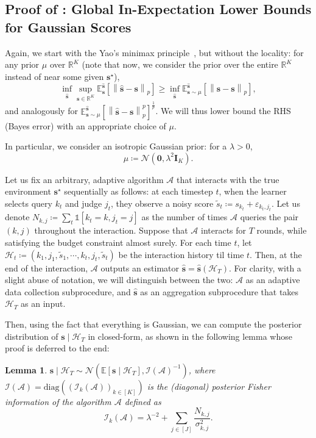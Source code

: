 \documentclass{article}
\def\vzero{{\bm{0}}}
\def\vs{{\bm{s}}}
\def\mI{{\bm{I}}}
\def\gA{{\mathcal{A}}}
\def\gH{{\mathcal{H}}}
\def\gI{{\mathcal{I}}}
\def\gN{{\mathcal{N}}}
\def\sR{{\mathbb{R}}}
\newcommand{\E}{\mathbb{E}}
\theoremstyle{plain}
\newtheorem{lemma}[theorem]{Lemma}
\theoremstyle{definition}
\theoremstyle{plain}
\newcommand{\bignorm}[1]{\left\lVert #1 \right\rVert}
\newcommand{\indicator}{\mathds{1}}
\begin{document}
\subsection{\texorpdfstring{Proof of : Global In-Expectation Lower Bounds for Gaussian Scores}{Proof of Theorem F.6: Global In-Expectation Lower Bounds for Gaussian Scores}}
\label{app:lower-bound-exp-gaussian}

Again, we start with the Yao's minimax principle~\citep{yao1977}, but without the locality: for any prior $\mu$ over $\sR^K$ (note that now, we consider the prior over the entire $\sR^K$ instead of near some given $\vs^\star$),
\begin{equation}
    \inf_{\hat{\vs}} \sup_{\vs \in \sR^K} \E^{\hat{\vs}}_{\vs}\left[ \bignorm{\hat{\vs} - \vs}_p \right] \geq \inf_{\hat{\vs}} \E^{\hat{\vs}}_{\vs \sim \mu}\left[ \bignorm{\hat{\vs} - \vs}_p \right],
\end{equation}
and analogously for $\E^{\hat{\vs}}_{\vs \sim \mu}\left[ \bignorm{\hat{\vs} - \vs}_p^p \right]^{\frac{1}{p}}$.
We will thus lower bound the RHS (Bayes error) with an appropriate choice of $\mu$.

In particular, we consider an isotropic Gaussian prior: for a $\lambda > 0$,
\begin{equation}
    \mu \coloneq \gN(\vzero, \lambda^2 \mI_K).
\end{equation}

Let us fix an arbitrary, adaptive algorithm $\gA$ that interacts with the true environment $\vs^\star$ sequentially as follows: at each timestep $t$, when the learner selects query $k_t$ and judge $j_t$, they observe a noisy score $\tilde{s}_t \coloneq s_{k_t} + \varepsilon_{k_t,j_t}$.
Let us denote $N_{k,j} \coloneq \sum_t \indicator[k_t = k, j_t = j]$ as the number of times $\gA$ queries the pair $(k, j)$ throughout the interaction.
Suppose that $\gA$ interacts for $T$ rounds, while satisfying the budget constraint almost surely.
For each time $t$, let $\gH_t \coloneq (k_1, j_1, \tilde{s}_1, \cdots, k_t, j_t, \tilde{s}_t)$ be the interaction history til time $t$.
Then, at the end of the interaction, $\gA$ outputs an estimator $\hat{\vs} = \hat{\vs}(\gH_T)$.
For clarity, with a slight abuse of notation, we will distinguish between the two: $\gA$ as an adaptive data collection subprocedure, and $\hat{\vs}$ as an aggregation subprocedure that takes $\gH_T$ as an input.

Then, using the fact that everything is Gaussian, we can compute the posterior distribution of $\vs \mid \gH_T$ in closed-form, as shown in the following lemma whose proof is deferred to the end:
\begin{lemma}
\label{lem:gaussian-posterior}
    $\vs \mid \gH_T \sim \gN(\E[\vs \mid \gH_T], \gI(\gA)^{-1})$, where $\gI(\gA) = \mathrm{diag}\left( (\gI_k(\gA))_{k \in [K]} \right)$ is the (diagonal) posterior Fisher information of the algorithm $\gA$ defined as
    \begin{equation}
        \gI_k(\gA) = \lambda^{-2} +\sum_{j \in [J]} \frac{N_{k,j}}{\sigma_{k,j}^2}.
    \end{equation}
\end{lemma}
\end{document}
